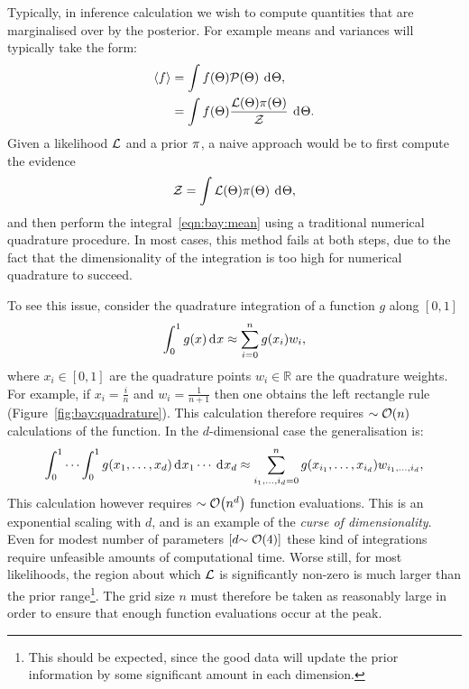 Typically, in inference calculation we wish to compute quantities that are marginalised over by the posterior. For example means and variances will typically take the form:
\begin{align}
  {\left\langle{f}\right\rangle} 
  &= \int f(\Theta)\mathcal{P}(\Theta)\:\operatorname{d}^{}\!{\Theta},
  \label{eqn:bay:mean}\\
  &= \int f(\Theta)\frac{\mathcal{L}(\Theta)\pi(\Theta)}{\mathcal{Z}}\:\operatorname{d}^{}\!{\Theta}.
\end{align}
Given a likelihood $\mathcal{L}$ and a prior $\pi$, a naive approach would be to first compute the evidence
\begin{equation}
  \mathcal{Z} = \int \mathcal{L}(\Theta) \pi(\Theta) \: \operatorname{d}^{}\!{\Theta},
  \label{eqn:bay:ev_short}
\end{equation}
and then perform the integral~\eqref{eqn:bay:mean} using a traditional numerical quadrature procedure. In most cases, this method fails at both steps, due to the fact that the dimensionality of the integration is too high for numerical quadrature to succeed.

To see this issue, consider the quadrature integration of a function $g$ along $[0,1]$
\begin{equation}
  \int_0^1 g(x) \operatorname{d}^{}\!{x} \approx \sum\limits_{i=0}^{n} g(x_i) w_i,
  \label{eqn:bay:quadrature_1d}
\end{equation}
where ${x_i\in[0,1]}$ are the quadrature points ${w_i\in\mathbb{R}}$ are the quadrature weights. For example, if $x_i = \frac{i}{n}$ and $w_i=\frac{1}{n+1}$ then one obtains the left rectangle rule (Figure~\ref{fig:bay:quadrature}). This calculation therefore requires ${\sim\mathcal{O}{\left(n\right)}}$ calculations of the function. In the $d$-dimensional case the generalisation is:
\begin{equation}
  \int_0^1\cdots\int_0^1 g(x_1,\ldots,x_d) \operatorname{d}^{}\!{x_1}\cdots \: \operatorname{d}^{}\!{x_d} \approx \sum\limits_{i_1,\ldots,i_d=0}^{n} g(x_{i_1},\ldots,x_{i_d}) w_{i_1,\ldots,i_d},
  \label{eqn:bay:quadrature_nd}
\end{equation}
This calculation however requires ${\sim\mathcal{O}{\left(n^d\right)}}$ function evaluations. This is an exponential scaling with $d$, and is an example of the {\em curse of dimensionality}. Even for modest number of parameters $\left[ d{\sim\mathcal{O}{\left(4\right)}} \right]$ these kind of integrations require unfeasible amounts of computational time. Worse still, for most likelihoods, the region about which $\mathcal{L}$ is significantly non-zero is much larger than the prior range\footnote{This should be expected, since the good data will update the prior information by some significant amount in each dimension.}. The grid size $n$ must therefore be taken as reasonably large in order to ensure that enough function evaluations occur at the peak.

